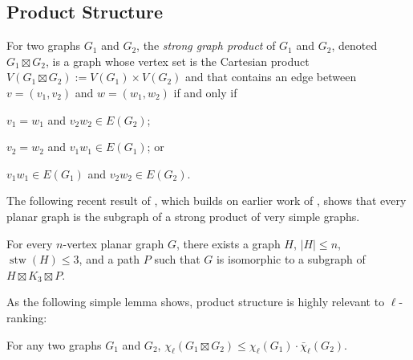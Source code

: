 \documentclass[kpfonts]{patmorin}
\DeclareMathOperator{\stw}{stw}
\newcommand{\lrn}{\chi_{\ell}}
\newcommand{\dlcn}{\bar{\chi}_\ell}
\theoremstyle{named}
\begin{document}
\subsection{Product Structure}

For two graphs $G_1$ and $G_2$, the \emph{strong graph product} of $G_1$ and $G_2$, denoted $G_1\boxtimes G_2$, is a graph whose vertex set is the Cartesian product $V(G_1\boxtimes G_2):= V(G_1)\times V(G_2)$ and that contains an edge between $v=(v_1,v_2)$ and $w=(w_1,w_2)$ if and only if
\begin{inparaenum}[(i)]
    \item $v_1=w_1$ and $v_2w_2\in E(G_2)$;
    \item $v_2=w_2$ and $v_1w_1\in E(G_1)$; or
    \item $v_1w_1\in E(G_1)$ and $v_2w_2\in E(G_2)$.
\end{inparaenum}

The following recent result of \citet{dujmovic.joret.ea:planar}, which builds on earlier work of \citet{pilipczuk.siebertz:polynomial}, shows that every planar graph is the subgraph of a strong product of very simple graphs.

\begin{thm}\label{product-structure}
    For every $n$-vertex planar graph $G$, there exists a graph $H$, $|H|\le n$, $\stw(H)\le 3$, and a path $P$ such that $G$ is isomorphic to a subgraph of $H\boxtimes K_3\boxtimes P$.
\end{thm}

As the following simple lemma shows, product structure is highly relevant to $\ell$-ranking:

\begin{lem}\label{product-lemma}
    For any two graphs $G_1$ and $G_2$, $\lrn(G_1\boxtimes G_2)\le \lrn(G_1)\cdot\dlcn(G_2)$.
\end{lem}
\end{document}
